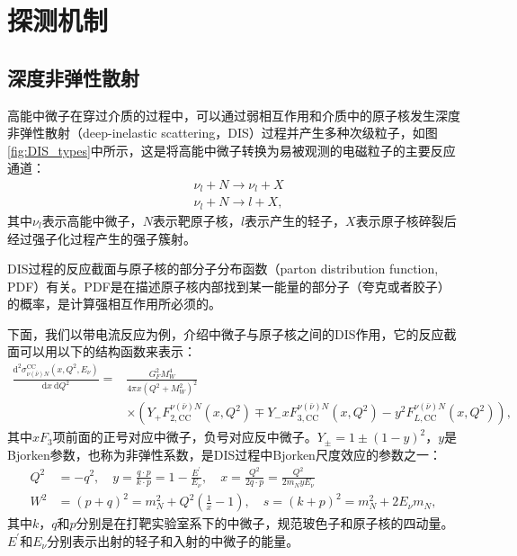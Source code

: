 \section{探测机制}

\subsection{深度非弹性散射}

高能中微子在穿过介质的过程中，可以通过弱相互作用和介质中的原子核发生深度非弹性散射（deep-inelastic scattering，DIS）\cite{Sarkar_DIS:2011, Bertone_DIS:2019}过程并产生多种次级粒子，如图\ref{fig:DIS_types}中所示，这是将高能中微子转换为易被观测的电磁粒子的主要反应通道：
\begin{equation}
    \begin{aligned}
        & \nu_l + N \rightarrow \nu_l + X \\
        & \nu_l + N \rightarrow l + X ,
    \end{aligned}
\end{equation}
其中$\nu_l$表示高能中微子，$N$表示靶原子核，$l$表示产生的轻子，$X$表示原子核碎裂后经过强子化过程产生的强子簇射。

DIS过程的反应截面与原子核的部分子分布函数（parton distribution function, PDF）有关。PDF是在描述原子核内部找到某一能量的部分子（夸克或者胶子）的概率，是计算强相互作用所必须的\cite{Soper_PDF:1997, NNPDF_PDF:2017}。

下面，我们以带电流反应为例，介绍中微子与原子核之间的DIS作用，它的反应截面可以用以下的结构函数来表示：
\begin{equation}
\begin{aligned}
    \frac{\mathrm{d}^2 \sigma_{\nu(\bar{\nu}) N}^{\mathrm{CC}}\left(x, Q^2, E_\nu\right)}{\mathrm{d} x \mathrm{~d} Q^2}= & \frac{G_F^2 M_W^4}{4 \pi x\left(Q^2+M_W^2\right)^2} \\
    & \times\left(Y_{+} F_{2, \mathrm{CC}}^{\nu(\bar{\nu}) N}\left(x, Q^2\right) \mp Y_{-} x F_{3, \mathrm{CC}}^{\nu(\bar{\nu}) N}\left(x, Q^2\right)-y^2 F_{L, \mathrm{CC}}^{\nu(\bar{\nu}) N}\left(x, Q^2\right)\right) ,
\end{aligned}
\end{equation}
其中$xF_3$项前面的正号对应中微子，负号对应反中微子。$Y_\pm = 1 \pm (1-y)^2$，$y$是Bjorken参数，也称为非弹性系数，是DIS过程中Bjorken尺度效应的参数之一：
\begin{equation}
\begin{aligned}
    Q^2 & =-q^2, \quad y=\frac{q \cdot p}{k \cdot p}=1-\frac{E^{\prime}}{E_\nu}, \quad x=\frac{Q^2}{2 q \cdot p}=\frac{Q^2}{2 m_N y E_\nu} \\
    W^2 & =(p+q)^2=m_N^2+Q^2\left(\frac{1}{x}-1\right), \quad s=(k+p)^2=m_N^2+2 E_\nu m_N,
\end{aligned}
\end{equation}
其中$k$，$q$和$p$分别是在打靶实验室系下的中微子，规范玻色子和原子核的四动量。$E^{\prime}$和$E_\nu$分别表示出射的轻子和入射的中微子的能量。

